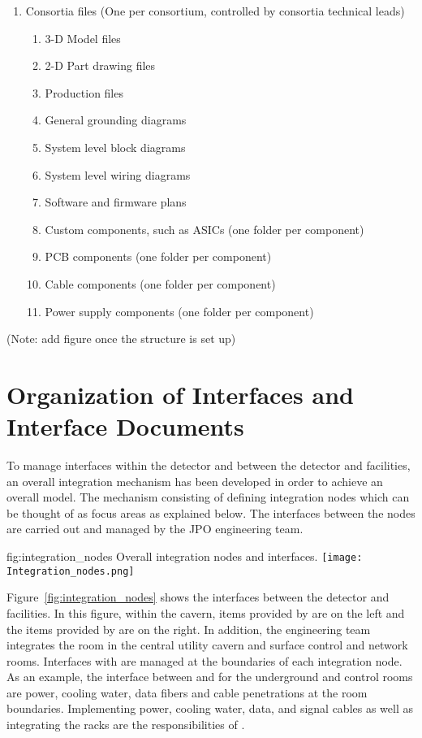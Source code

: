 \begin{enumerate}
\begin{enumerate}
\begin{enumerate}
  \end{enumerate}
 \end{enumerate}
 \item Consortia files (One per consortium, controlled by consortia technical leads)
 \begin{enumerate}
   \item 3-D Model files
   \item 2-D Part drawing files
   \item Production files
   \item General grounding diagrams
   \item System level block diagrams
   \item System level wiring diagrams
   \item Software and firmware plans
   \item Custom components, such as ASICs (one folder per component)
   \item PCB components (one folder per component)
   \item Cable components (one folder per component)
   \item Power supply components (one folder per component)
 \end{enumerate}
\end{enumerate}
(Note: add figure once the  structure is set up)


\section{ Organization of Interfaces and Interface Documents}
\label{sec:fdsp-coord-integ-interface}

To manage interfaces within the detector and between the
detector and facilities, an overall integration mechanism has been
developed in order to achieve an overall model. 
The mechanism consisting of defining integration nodes which can
be thought of as focus areas as explained below.  
The interfaces between the nodes are carried out and managed by the JPO engineering team.


\begin{dunefigure}{fig:integration_nodes}
  {Overall integration nodes and interfaces.}
  \texttt{[image: Integration\_nodes.png]}
\end{dunefigure}

Figure~\ref{fig:integration_nodes} shows the interfaces between the
detector and facilities. In this figure, within the cavern, items provided by  are
on the left and the items provided by  are on the
right. In addition, the  engineering team integrates the
 room in the central utility cavern and surface control and
network rooms. Interfaces with  are managed at the
boundaries of each integration node. As an example, the interface
between  and  for the underground 
and control rooms are power, cooling water, data fibers and cable
penetrations at the room boundaries. Implementing power, cooling
water, data, and signal cables as well as integrating the racks are
the responsibilities of .



